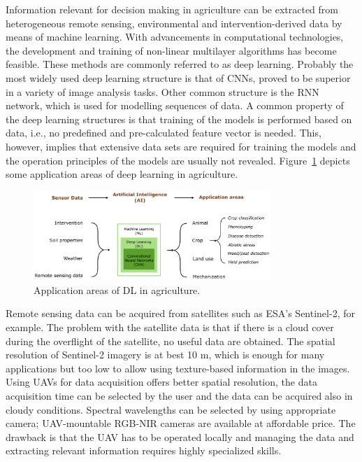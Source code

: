 Information relevant for decision making in agriculture can be extracted from heterogeneous remote sensing, environmental and intervention-derived data by means of machine learning. With advancements in computational technologies, the development and training of non-linear multilayer algorithms has become feasible. These methods are commonly referred to as deep learning. Probably the most widely used deep learning structure is that of CNNs, proved to be superior in a variety of image analysis tasks. Other common structure is the RNN network, which is used for modelling sequences of data. A common property of the deep learning structures is that training of the models is performed based on data, i.e., no predefined and pre-calculated feature vector is needed. This, however, implies that extensive data sets are required for training the models and the operation principles of the models are usually not revealed. Figure~\ref{fig:ii-AgroAI_Topics} depicts some application areas of deep learning in agriculture.

\begin{figure}[htb]
    \centering
    \includegraphics[width = 0.8\textwidth]{images/ii-AgroAI_Topics.png}
    \caption{Application areas of DL in agriculture.}
    \label{fig:ii-AgroAI_Topics}
\end{figure}

Remote sensing data can be acquired from satellites such as ESA’s Sentinel-2, for example. The problem with the satellite data is that if there is a cloud cover during the overflight of the satellite, no useful data are obtained. The spatial resolution of Sentinel-2 imagery is at best 10 m, which is enough for many applications but too low to allow using texture-based information in the images. Using UAVs for data acquisition offers better spatial resolution, the data acquisition time can be selected by the user and the data can be acquired also in cloudy conditions. Spectral wavelengths can be selected by using appropriate camera; UAV-mountable RGB-NIR cameras are available at affordable price. The drawback is that the UAV has to be operated locally and managing the data and extracting relevant information requires highly specialized skills.


